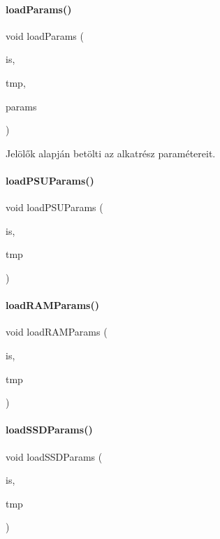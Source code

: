 \paragraph{\texorpdfstring{loadParams()}{loadParams()}}
{\footnotesize\ttfamily void load\+Params (\begin{DoxyParamCaption}\item[{std\+::fstream \&}]{is,  }\item[{\mbox{\hyperlink{struct_temp_input}{Temp\+Input}} \&}]{tmp,  }\item[{int const}]{params }\end{DoxyParamCaption})}



Jelölők alapján betölti az alkatrész paramétereit. 

\mbox{\label{_inventory_8cpp_a198252da076147a0ef1f4d721bdb2219}} 
\paragraph{\texorpdfstring{loadPSUParams()}{loadPSUParams()}}
{\footnotesize\ttfamily void load\+P\+S\+U\+Params (\begin{DoxyParamCaption}\item[{std\+::istream \&}]{is,  }\item[{\mbox{\hyperlink{struct_temp_input}{Temp\+Input}} \&}]{tmp }\end{DoxyParamCaption})}

\mbox{\label{_inventory_8cpp_aec5377baa2a6064a69b04423103d85ea}} 
\paragraph{\texorpdfstring{loadRAMParams()}{loadRAMParams()}}
{\footnotesize\ttfamily void load\+R\+A\+M\+Params (\begin{DoxyParamCaption}\item[{std\+::istream \&}]{is,  }\item[{\mbox{\hyperlink{struct_temp_input}{Temp\+Input}} \&}]{tmp }\end{DoxyParamCaption})}

\mbox{\label{_inventory_8cpp_ac358a7371dcac8ed9d7aba003099c193}} 
\paragraph{\texorpdfstring{loadSSDParams()}{loadSSDParams()}}
{\footnotesize\ttfamily void load\+S\+S\+D\+Params (\begin{DoxyParamCaption}\item[{std\+::istream \&}]{is,  }\item[{\mbox{\hyperlink{struct_temp_input}{Temp\+Input}} \&}]{tmp }\end{DoxyParamCaption})}


